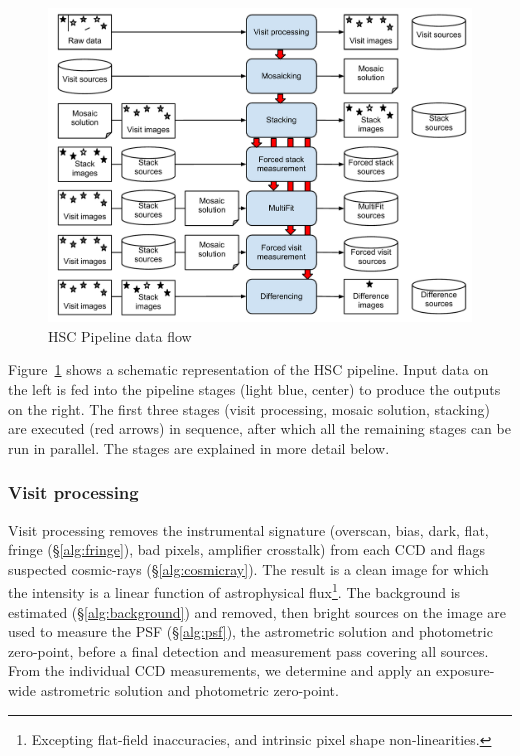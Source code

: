 \documentclass[12pt]{article}
\begin{document}
\begin{figure}[!htbp]
    \centering
    \includegraphics[scale=0.5]{figures/HSCpipelinesketch}
    \caption{HSC Pipeline data flow\label{fig:flow}}
\end{figure}

Figure~\ref{fig:flow} shows a schematic representation of the HSC pipeline.  Input data on the left is fed
into the pipeline stages (light blue, center) to produce the outputs on the right.  The first three stages
(visit processing, mosaic solution, stacking) are executed (red arrows) in sequence,
after which all the remaining stages
can be run in parallel.  The stages are explained in more detail below.

\subsubsection{Visit processing}

Visit processing removes the instrumental signature (overscan, bias, dark, flat, fringe (\S\ref{alg:fringe}),
bad pixels, amplifier
crosstalk) from each CCD and flags suspected cosmic-rays (\S\ref{alg:cosmicray}).  The result is a clean
image for which the intensity
is a linear function of astrophysical flux\footnote{Excepting flat-field inaccuracies, and intrinsic pixel
  shape non-linearities.}.  The background is estimated (\S\ref{alg:background}) and removed, then bright
sources on the image are used
to measure the PSF (\S\ref{alg:psf}), the astrometric solution and photometric zero-point, before a final
detection and
measurement pass covering all sources.  From the individual CCD measurements, we determine and apply an
exposure-wide astrometric
solution and photometric zero-point.
\end{document}

